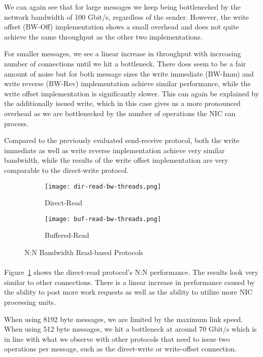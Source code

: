 We can again see that for large messages we keep being bottlenecked by the network bandwidth of 100 Gbit/s, regardless of 
the sender. However, the write offset (BW-Off) implementation shows a small overhead and does not quite achieve the same 
throughput as the other two implementations. 

For smaller messages, we see a linear increase in throughput with increasing number of connections until we hit a bottleneck. 
There does seem to be a fair amount of noise
but for both message sizes the write immediate (BW-Imm) and write reverse (BW-Rev) implementation achieve similar performance,
while the write offset implementation is significantly slower. This can again be explained by the additionally issued write, 
which in this case  gives us a more pronounced overhead as we are bottlenecked by the number of operations the NIC can process.


Compared to the previously evaluated send-receive protocol, both the write immediate as well as write reverse implementation
achieve very 
similar bandwidth, while the results of the write offset implementation are very comparable to the direct-write protocol.


\begin{figure}[ht]
  \begin{subfigure}[b]{0.49\textwidth}
  \centering
  \texttt{[image: dir-read-bw-threads.png]}
  \caption{Direct-Read}
  \label{fig:plot-dirread-bw-threads}
  \end{subfigure}
  \begin{subfigure}[b]{0.49\textwidth}
  \centering
  \texttt{[image: buf-read-bw-threads.png]}
  \caption{Buffered-Read}
  \label{fig:plot-bufread-bw-threads}
  \end{subfigure}
  \caption{N:N Bandwidth Read-based Protocols}
\end{figure}

\paragraph{}Figure~\ref{fig:plot-dirread-bw-threads} shows the direct-read protocol's N:N performance. The results look very similar to 
other connections. There is a linear increase in performance caused by the ability to post more work requests  
as well as the ability to utilize more NIC processing units.~\cite{anuj-guide}

When using 8192 byte messages, we are limited by the maximum link speed. When using 512 byte messages, we hit a bottleneck at
around 70 Gbit/s which is in line with what we observe with other protocols that need to issue two operations per message, 
such as the direct-write or write-offset connection.




